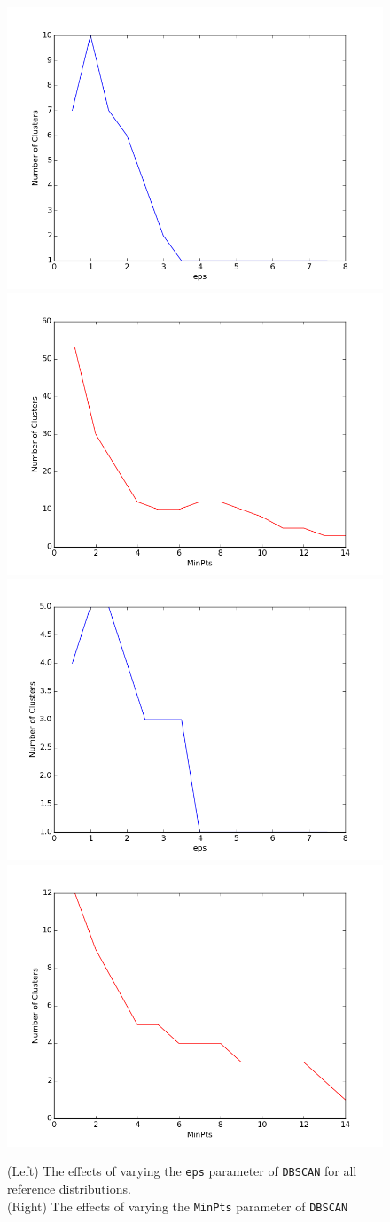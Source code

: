 \documentclass[12pt]{article}
\begin{document}
\begin{figure}[ht]
\includegraphics[width=0.4\linewidth]{plots/jain_eps}    \includegraphics[width=0.4\linewidth]{plots/jain_minpts} \\
\includegraphics[width=0.4\linewidth]{plots/spiral_eps}  \includegraphics[width=0.4\linewidth]{plots/spiral_minpts}
\caption{(Left) The effects of varying the \texttt{eps} parameter of \texttt{DBSCAN} for all reference distributions. \\ 
(Right) The effects of varying the \texttt{MinPts} parameter of \texttt{DBSCAN}}
\label{fig:eps}
\end{figure}



\clearpage


\end{document}
